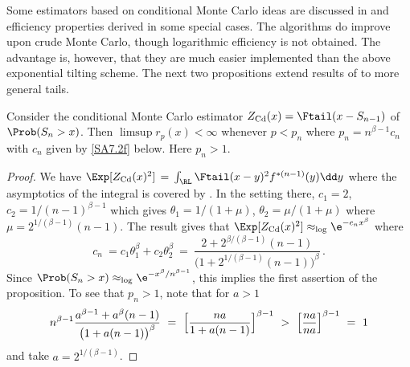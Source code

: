 Some  estimators  based on conditional Monte Carlo ideas
are discussed in \cite{asmussen2017conditional} and efficiency properties derived in some
special cases. The algorithms do improve upon crude Monte Carlo, though logarithmic
efficiency is not obtained. The advantage is, however, that they are much easier implemented than the above exponential tilting scheme. The next two propositions extend
results of \cite{asmussen2017conditional} to more general tails.

\begin{proposition}\label{Prop:SA7.2a} Consider the conditional Monte Carlo
estimator $Z_{\rm Cd}(x)=\Ftail(x-S_{n-1})$ of $\Prob(S_n>x)$. Then
$\limsup r_p(x)<\infty$ whenever $p<p_n$ where $p_n=n^{\beta-1}c_n$ with $c_n$ given by
\eqref{SA7.2f} below. Here $p_n>1$.
\end{proposition}
\begin{proof} We have
$\Exp [Z_{\rm Cd}(x)^2] \,=\, \int_{\RL} \Ftail(x-y)^2 f^{*(n-1)}(y)\dd y$
where the asymptotics of the integral is covered by . In the setting
there, $c_1=2$, $c_2=1/(n-1)^{\beta-1}$ which gives $\theta_1=1/(1+\mu)$,
$\theta_2=\mu/(1+\mu)$ where $\mu=2^{1/(\beta -1)}(n-1)$. The result gives that
$\Exp [Z_{\rm Cd}(x)^2]\approx_{\log} \e^{-c_nx^\beta}$ where
\begin{equation}\label{SA7.2f}c_n\ = c_1\theta_1^\beta+c_2\theta_2^\beta\ =\ \frac{2+2^{\beta/(\beta-1)}(n-1)}
{\bigl(1+2^{1/(\beta-1)}(n-1)\bigr)^\beta}\,.
\end{equation}
Since $\Prob(S_n>x)\approx_{\log}\e^{-x^\beta/n^{\beta-1}}$, this implies the first assertion of the proposition. To see that
$p_n>1$, note that for $a>1$
\[ n^{\beta-1}\frac{a^{\beta-1}+a^\beta (n-1)}{\bigl(1+a(n-1)\bigr)^\beta}\ =\ \Bigl[\frac{na}{1+a(n-1)}\Bigr]^{\beta-1}\ >\ \Bigl[\frac{na}{na}\Bigr]^{\beta-1}\ =\ 1
\]
and take $a=2^{1/(\beta-1)}$.
\end{proof}

